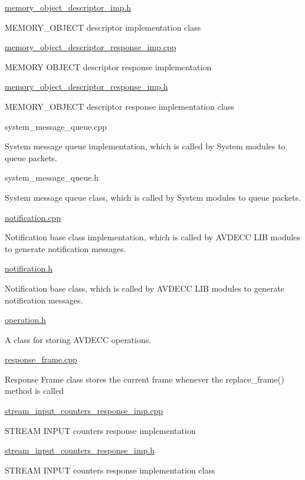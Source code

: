 \hyperlink{memory__object__descriptor__imp_8h}{memory\+\_\+object\+\_\+descriptor\+\_\+imp.\+h}

M\+E\+M\+O\+R\+Y\+\_\+\+O\+B\+J\+E\+CT descriptor implementation class

\hyperlink{memory__object__descriptor__response__imp_8cpp}{memory\+\_\+object\+\_\+descriptor\+\_\+response\+\_\+imp.\+cpp}

M\+E\+M\+O\+RY O\+B\+J\+E\+CT descriptor response implementation

\hyperlink{memory__object__descriptor__response__imp_8h}{memory\+\_\+object\+\_\+descriptor\+\_\+response\+\_\+imp.\+h}

M\+E\+M\+O\+R\+Y\+\_\+\+O\+B\+J\+E\+CT descriptor response implementation class

system\+\_\+message\+\_\+queue.\+cpp

System message queue implementation, which is called by System modules to queue packets.

system\+\_\+message\+\_\+queue.\+h

System message queue class, which is called by System modules to queue packets.

\hyperlink{notification_8cpp}{notification.\+cpp}

Notification base class implementation, which is called by A\+V\+D\+E\+CC L\+IB modules to generate notification messages.

\hyperlink{notification_8h}{notification.\+h}

Notification base class, which is called by A\+V\+D\+E\+CC L\+IB modules to generate notification messages.

\hyperlink{operation_8h}{operation.\+h}

A class for storing A\+V\+D\+E\+CC operations.

\hyperlink{response__frame_8cpp}{response\+\_\+frame.\+cpp}

Response Frame class stores the current frame whenever the replace\+\_\+frame() method is called

\hyperlink{stream__input__counters__response__imp_8cpp}{stream\+\_\+input\+\_\+counters\+\_\+response\+\_\+imp.\+cpp}

S\+T\+R\+E\+AM I\+N\+P\+UT counters response implementation

\hyperlink{stream__input__counters__response__imp_8h}{stream\+\_\+input\+\_\+counters\+\_\+response\+\_\+imp.\+h}

S\+T\+R\+E\+AM I\+N\+P\+UT counters response implementation class

